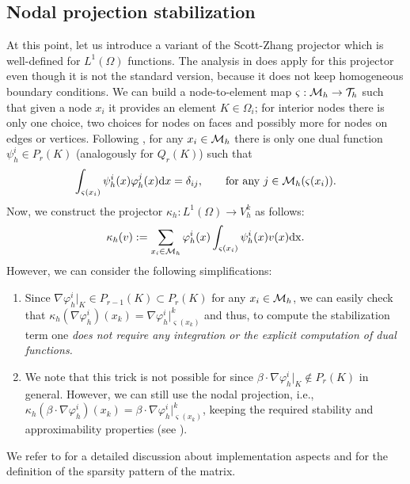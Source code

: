 \subsection{Nodal projection stabilization}

At this point, let us introduce a variant of the Scott-Zhang projector \cite{scott_finite_1990} which is well-defined for $L^1(\Omega)$ functions. The analysis in \cite{scott_finite_1990} does apply for this projector even though it is not the standard version, because it does not keep homogeneous boundary conditions. We can build a node-to-element map $\varsigma: \mathcal{M}_h \rightarrow  \mathcal{T}_h$ such that given a node $x_i$ it provides an element $K \in \Omega_i$; for interior nodes there is only one choice, two choices for nodes on faces and possibly more for nodes on edges or vertices. Following \cite{scott_finite_1990}, for any $x_i \in \mathcal{M}_h$ there is only one dual function $\psi^i_h \in P_r(K)$ (analogously for $Q_r(K)$) such that
\begin{align}\label{eq-dualfunct}
\int_{\varsigma(x_i)} \psi_h^i(x)\varphi_h^j(x) {\rm d}x = \delta_{ij}, \qquad \hbox{for any}\ j\in\mathcal{M}_h(\varsigma(x_i)).
\end{align}
Now, we construct the projector $\kappa_h: L^1(\Omega) \rightarrow V^k_h$ as follows:
\begin{align}\label{eq-projSZ}
\kappa_h(v) := \sum_{x_i \in \mathcal{M}_h}  \varphi^i_h(x) \int_{\varsigma(x_i)} \psi_h^i(x) v(x) \rm{d} x.\end{align} 
However, we can consider the following simplifications:
\begin{enumerate}
\item Since $\nabla \varphi^i_h|_K \in P_{r-1}(K) \subset P_r(K)$ for any $x_i \in \mathcal{M}_h$, we can easily check that $\kappa_h(\nabla \varphi^i_h)(x_k) =  \nabla \varphi^i_h|^k_ {\varsigma(x_k)}$ and thus, to compute the stabilization term  one \emph{does not require any integration or the explicit computation of dual functions.} 
\item We note that this trick is not possible for  since $\beta \cdot \nabla \varphi^i_h|_K \not\in P_{r}(K)$ in general. However, we can still use the nodal projection, i.e., $\kappa_h(\beta \cdot \nabla \varphi^i_h)(x_k) =  \beta \cdot \nabla \varphi^i_h|^k_ {\varsigma(x_k)}$, keeping the required stability and approximability properties (see \cite{rebollo_high_2013}).
\end{enumerate}
We refer to \cite{badia_stabilized_2012} for a detailed discussion about implementation aspects and for the definition of the sparsity pattern of the matrix. 

